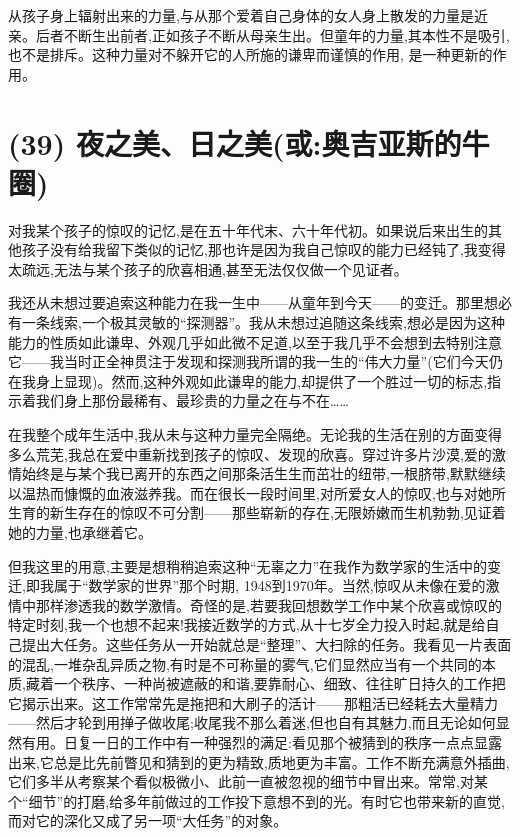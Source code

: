 从孩子身上辐射出来的力量,与从那个爱着自己身体的女人身上散发的力量是近亲。后者不断生出前者,正如孩子不断从母亲生出。但童年的力量,其本性不是吸引,也不是排斥。这种力量对不躲开它的人所施的谦卑而谨慎的作用,
是一种更新的作用。

\section{(39) 夜之美、日之美(或:奥吉亚斯的牛圈)}

对我某个孩子的惊叹的记忆,是在五十年代末、六十年代初。如果说后来出生的其他孩子没有给我留下类似的记忆,那也许是因为我自己惊叹的能力已经钝了,我变得太疏远,无法与某个孩子的欣喜相通,甚至无法仅仅做一个见证者。

我还从未想过要追索这种能力在我一生中——从童年到今天——的变迁。那里想必有一条线索,一个极其灵敏的“探测器”。我从未想过追随这条线索,想必是因为这种能力的性质如此谦卑、外观几乎如此微不足道,以至于我几乎不会想到去特别注意它——我当时正全神贯注于发现和探测我所谓的我一生的“伟大力量”(它们今天仍在我身上显现)。然而,这种外观如此谦卑的能力,却提供了一个胜过一切的标志,指示着我们身上那份最稀有、最珍贵的力量之在与不在……

在我整个成年生活中,我从未与这种力量完全隔绝。无论我的生活在别的方面变得多么荒芜,我总在爱中重新找到孩子的惊叹、发现的欣喜。穿过许多片沙漠,爱的激情始终是与某个我已离开的东西之间那条活生生而茁壮的纽带,一根脐带,默默继续以温热而慷慨的血液滋养我。而在很长一段时间里,对所爱女人的惊叹,也与对她所生育的新生存在的惊叹不可分割——那些崭新的存在,无限娇嫩而生机勃勃,见证着她的力量,也承继着它。

但我这里的用意,主要是想稍稍追索这种“无辜之力”在我作为数学家的生活中的变迁,即我属于“数学家的世界”那个时期, 1948到1970年。当然,惊叹从未像在爱的激情中那样渗透我的数学激情。奇怪的是,若要我回想数学工作中某个欣喜或惊叹的特定时刻,我一个也想不起来!我接近数学的方式,从十七岁全力投入时起,就是给自己提出大任务。这些任务从一开始就总是“整理”、大扫除的任务。我看见一片表面的混乱,一堆杂乱异质之物,有时是不可称量的雾气,它们显然应当有一个共同的本质,藏着一个秩序、一种尚被遮蔽的和谐,要靠耐心、细致、往往旷日持久的工作把它揭示出来。这工作常常先是拖把和大刷子的活计——那粗活已经耗去大量精力——然后才轮到用掸子做收尾;收尾我不那么着迷,但也自有其魅力,而且无论如何显然有用。日复一日的工作中有一种强烈的满足:看见那个被猜到的秩序一点点显露出来,它总是比先前瞥见和猜到的更为精致,质地更为丰富。工作不断充满意外插曲,它们多半从考察某个看似极微小、此前一直被忽视的细节中冒出来。常常,对某个“细节”的打磨,给多年前做过的工作投下意想不到的光。有时它也带来新的直觉,而对它的深化又成了另一项“大任务”的对象。

